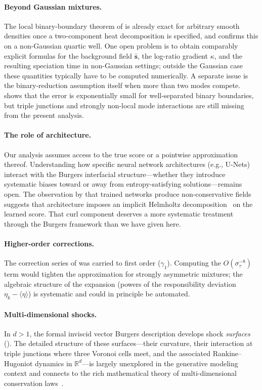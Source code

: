 \documentclass[11pt]{article}
\newcommand{\R}{\mathbb{R}}
\begin{document}
\paragraph{Beyond Gaussian mixtures.}
The local binary-boundary theorem of  is already exact for arbitrary smooth densities once a two-component heat decomposition is specified, and  confirms this on a non-Gaussian quartic well.
One open problem is to obtain comparably explicit formulas for the background field $\bar{\bm{s}}$, the log-ratio gradient $\kappa$, and the resulting speciation time in non-Gaussian settings; outside the Gaussian case these quantities typically have to be computed numerically. A separate issue is the binary-reduction assumption itself when more than two modes compete.  shows that the error is exponentially small for well-separated binary boundaries, but triple junctions and strongly non-local mode interactions are still missing from the present analysis.

\paragraph{The role of architecture.}
Our analysis assumes access to the true score or a pointwise approximation thereof.
Understanding how specific neural network architectures (e.g., U-Nets) interact with the Burgers interfacial structure---whether they introduce systematic biases toward or away from entropy-satisfying solutions---remains open.
The observation by \citet{vuong2025score} that trained networks produce non-conservative fields suggests that architecture imposes an implicit Helmholtz decomposition~\citep{bhatia2013helmholtz} on the learned score. That curl component deserves a more systematic treatment through the Burgers framework than we have given here.

\paragraph{Higher-order corrections.}
The correction series of  was carried to first order ($\gamma_1$).
Computing the $O(\sigma_\tau^{-8})$ term would tighten the approximation for strongly asymmetric mixtures; the algebraic structure of the expansion (powers of the responsibility deviation $\eta_k - \langle\eta\rangle$) is systematic and could in principle be automated.

\paragraph{Multi-dimensional shocks.}
In $d > 1$, the formal inviscid vector Burgers description develops shock \emph{surfaces} ().
The detailed structure of these surfaces---their curvature, their interaction at triple junctions where three Voronoi cells meet, and the associated Rankine--Hugoniot dynamics in $\R^d$---is largely unexplored in the generative modeling context and connects to the rich mathematical theory of multi-dimensional conservation laws~\citep{evans2010partial}.
\end{document}
